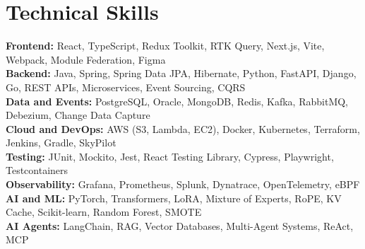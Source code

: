 \documentclass[a4paper,10pt]{article}
\begin{document}
\section{Technical Skills}
{\small
    \textbf{Frontend:} React, TypeScript, Redux Toolkit, RTK Query, Next.js, Vite, Webpack, Module Federation, Figma \\
    \textbf{Backend:} Java, Spring, Spring Data JPA, Hibernate, Python, FastAPI, Django, Go, REST APIs, Microservices, Event Sourcing, CQRS \\
    \textbf{Data and Events:} PostgreSQL, Oracle, MongoDB, Redis, Kafka, RabbitMQ, Debezium, Change Data Capture \\
    \textbf{Cloud and DevOps:} AWS (S3, Lambda, EC2), Docker, Kubernetes, Terraform, Jenkins, Gradle, SkyPilot \\
    \textbf{Testing:} JUnit, Mockito, Jest, React Testing Library, Cypress, Playwright, Testcontainers \\
    \textbf{Observability:} Grafana, Prometheus, Splunk, Dynatrace, OpenTelemetry, eBPF \\
    \textbf{AI and ML:} PyTorch, Transformers, LoRA, Mixture of Experts, RoPE, KV Cache, Scikit-learn, Random Forest, SMOTE \\
    \textbf{AI Agents:} LangChain, RAG, Vector Databases, Multi-Agent Systems, ReAct, MCP \\
}
\end{document}
